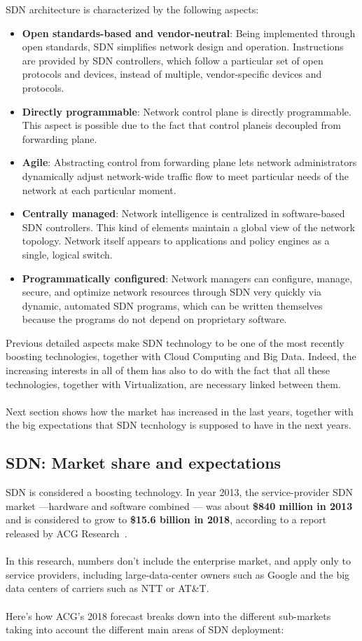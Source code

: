 \documentclass[a4paper, 12pt]{book}
\begin{document}
SDN architecture is characterized by the following aspects:
\begin{itemize}
\item{\textbf{Open standards-based and vendor-neutral}}: Being implemented through open standards, SDN simplifies network design and operation. Instructions are provided by SDN controllers, which follow a particular set of open protocols and devices, instead of multiple, vendor-specific devices and protocols.
\item{\textbf{Directly programmable}}: Network control plane is directly programmable. This aspect is possible due to the fact that control planeis decoupled from forwarding plane.
\item{\textbf{Agile}}: Abstracting control from forwarding plane lets network administrators dynamically adjust network-wide traffic flow to meet particular needs of the network at each particular moment.
\item{\textbf{Centrally managed}}: Network intelligence is centralized in software-based SDN controllers. This kind of elements maintain a global view of the network topology. Network itself appears to applications and policy engines as a single, logical switch.
\item{\textbf{Programmatically configured}}: Network managers can configure, manage, secure, and optimize network resources through SDN very quickly via dynamic, automated SDN programs, which can be written themselves because the programs do not depend on proprietary software.
\end{itemize}
Previous detailed aspects make SDN technology to be one of the most recently boosting technologies, together with Cloud Computing and Big Data. Indeed, the increasing interests in all of them has also to do with the fact that all these technologies, together with Virtualization, are necessary linked between them.\\
\\
Next section shows how the market has increased in the last years, together with the big expectations that SDN tecnhology is supposed to have in the next years.

\subsection{SDN: Market share and expectations}
\label{subsec:sdn_marketshare}

SDN is considered a boosting technology. In year 2013, the service-provider SDN market —hardware and software combined — was about \textbf{\$840 million in 2013} and is considered to grow to \textbf{\$15.6 billion in 2018}, according to a report released by ACG Research~\cite{SDN2018expectations00}.\\
\\
In this research, numbers don’t include the enterprise market, and apply only to service providers, including large-data-center owners such as Google and the big data centers of carriers such as NTT or AT\&T.\\
\\
Here’s how ACG’s 2018 forecast breaks down into the different sub-markets taking into account the different main areas of SDN deployment:
\end{document}
